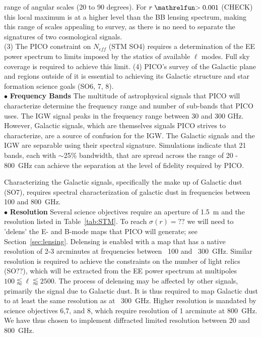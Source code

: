 \documentclass[PICOReport.tex]{subfiles}
\begin{document}
range of angular scales (20 to 90 degrees). For $r \simgt 0.001$ (CHECK)
this local maximum is at a higher level than the BB lensing spectrum, making this range of scales appealing 
to survey, as there is no need to separate the signatures of two cosmological signals. \\
(3) The PICO constraint on $N_{eff}$ (STM SO4) requires a determination of the EE power spectrum to limits
imposed by the statics of available $\ell$ modes. Full sky coverage is required to achieve this limit.  
(4) PICO's survey of the Galactic plane and regions outside of it is essential to achieving its Galactic structure 
and star formation science goals (SO6, 7, 8). \\
%
$\bullet$ {\bf Frequency Bands} \hspace{0.1in} The multitude of astrophysical signals that PICO will characterize 
determine the frequency range and number of sub-bands that PICO uses. The IGW signal peaks 
in the frequency range between 30 and 300 GHz. However, Galactic signals, which are themselves signals PICO strives to 
characterize, are a source of confusion for the IGW. The Galactic signals and the IGW are separable using their 
spectral signature. Simulations indicate that 21 bands, each with $\sim$25\% bandwidth, that are spread across 
the range of 20 - 800~GHz can achieve the separation at the level of fidelity required by PICO. 

Characterizing the Galactic signals, specifically the make up of Galactic dust (SO7), requires spectral characterization 
of galactic dust in frequencies between 100 and 800~GHz.  \\
%
$\bullet$ {\bf Resolution} \hspace{0.1in} 
Several science objectives require an aperture of 1.5~m and the resolution listed in Table~\ref{tab:STM}. To reach 
$\sigma(r) = ??$ we will need to 'delens' the E- and B-mode maps that PICO will generate; see Section~\ref{sec:lensing}. 
Delensing is enabled with a map that has a native resolution of 2-3 arcminutes at frequencies between ~100 and ~300~GHz. 
Similar resolution is required to achieve the constraints on the number of light relics (SO??), which will be extracted from the 
EE power spectrum at multipoles $100 \lessapprox \ell \lessapprox 2500$.  
The process of delensing may be affected by other signals, primarily the signal due to Galactic dust. It is thus required to 
map Galactic dust to at least the same resolution as at ~300~GHz. Higher resolution is mandated by science objectives 
6,7, and 8, which require resolution of 1 arcminute at 800~GHz.  We have thus chosen to implement diffracted limited 
resolution between 20 and 800~GHz. \\
%

 
\end{document}
